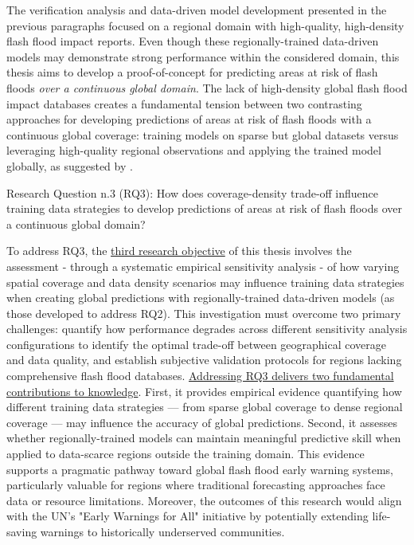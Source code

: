 The  verification analysis and data-driven model development presented in the previous paragraphs focused on a regional domain with high-quality, high-density flash flood impact reports. Even though these regionally-trained data-driven models may demonstrate strong performance within the considered domain, this thesis aims to develop a proof-of-concept for predicting areas at risk of flash floods \textit{over a continuous global domain}. The lack of high-density global flash flood impact databases \citep{Panwar_2020} creates a fundamental tension between two contrasting approaches for developing predictions of areas at risk of flash floods with a continuous global coverage: training models on sparse but global datasets versus leveraging high-quality regional observations and applying the trained model globally, as suggested by \citet{Kratzert_2024}. 

\begin{tcolorbox}[
  colframe=colour_chapter7,  
  colback=white,           
  sharp corners,        
  boxrule=2mm,          
  left=0mm,             
  right=0mm,            
  toprule=0mm,          
  bottomrule=0mm,       
  rightrule=2mm        
]
{\color{colour_chapter7} {\setlength{\parindent}{1.0em} Research Question n.3 (RQ3): How does coverage-density trade-off influence training data strategies to develop predictions of areas at risk of flash floods over a continuous global domain?}}
\end{tcolorbox}

\noindent To address RQ3, the \uline{third research objective} of this thesis involves the assessment - through a systematic empirical sensitivity analysis - of how varying spatial coverage and data density scenarios may influence training data strategies when creating global predictions with regionally-trained data-driven models (as those developed to address RQ2). This investigation must overcome two primary challenges: quantify how performance degrades across different sensitivity analysis configurations to identify the optimal trade-off between geographical coverage and data quality, and establish subjective validation protocols for regions lacking comprehensive flash flood databases. \uline{Addressing RQ3 delivers two fundamental contributions to knowledge}. First, it provides empirical evidence quantifying how different training data strategies — from sparse global coverage to dense regional coverage — may influence the accuracy of global predictions. Second, it assesses whether regionally-trained models can maintain meaningful predictive skill when applied to data-scarce regions outside the training domain. This evidence supports a pragmatic pathway toward global flash flood early warning systems, particularly valuable for regions where traditional forecasting approaches face data or resource limitations. Moreover, the outcomes of this research would align with the UN's "Early Warnings for All" initiative by potentially extending life-saving warnings to historically underserved communities.

